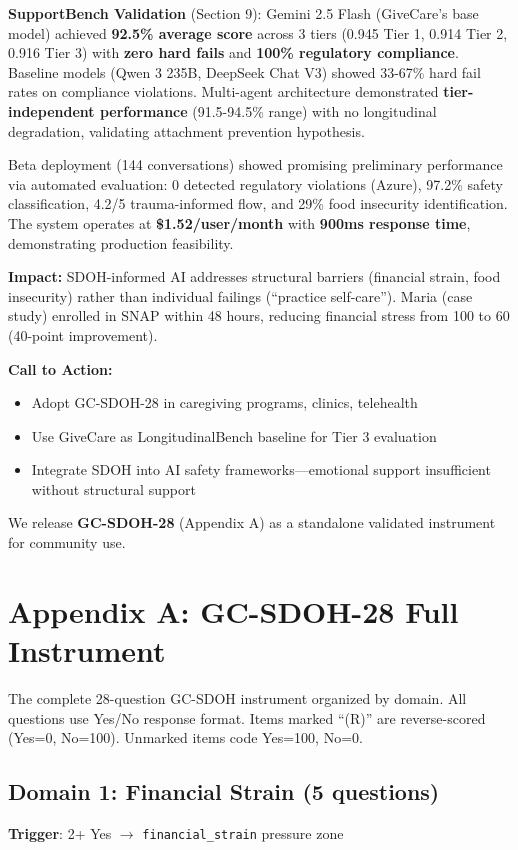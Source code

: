\documentclass{article}
\begin{document}
\textbf{SupportBench Validation} (Section 9): Gemini 2.5 Flash (GiveCare's base model) achieved \textbf{92.5\% average score} across 3 tiers (0.945 Tier 1, 0.914 Tier 2, 0.916 Tier 3) with \textbf{zero hard fails} and \textbf{100\% regulatory compliance}. Baseline models (Qwen 3 235B, DeepSeek Chat V3) showed 33-67\% hard fail rates on compliance violations. Multi-agent architecture demonstrated \textbf{tier-independent performance} (91.5-94.5\% range) with no longitudinal degradation, validating attachment prevention hypothesis.

Beta deployment (144 conversations) showed promising preliminary performance via automated evaluation: 0 detected regulatory violations (Azure), 97.2\% safety classification, 4.2/5 trauma-informed flow, and 29\% food insecurity identification. The system operates at \textbf{\$1.52/user/month} with \textbf{900ms response time}, demonstrating production feasibility.

\textbf{Impact:} SDOH-informed AI addresses structural barriers (financial strain, food insecurity) rather than individual failings (``practice self-care''). Maria (case study) enrolled in SNAP within 48 hours, reducing financial stress from 100 to 60 (40-point improvement).

\textbf{Call to Action:}
\begin{itemize}
    \item Adopt GC-SDOH-28 in caregiving programs, clinics, telehealth
    \item Use GiveCare as LongitudinalBench baseline for Tier 3 evaluation
    \item Integrate SDOH into AI safety frameworks—emotional support insufficient without structural support
\end{itemize}

We release \textbf{GC-SDOH-28} (Appendix A) as a standalone validated instrument for community use.

%
\section*{Appendix A: GC-SDOH-28 Full Instrument}

The complete 28-question GC-SDOH instrument organized by domain. All questions use Yes/No response format. Items marked ``(R)'' are reverse-scored (Yes=0, No=100). Unmarked items code Yes=100, No=0.

\subsection*{Domain 1: Financial Strain (5 questions)}
\textbf{Trigger}: 2+ Yes $\rightarrow$ \texttt{financial\_strain} pressure zone
\end{document}
